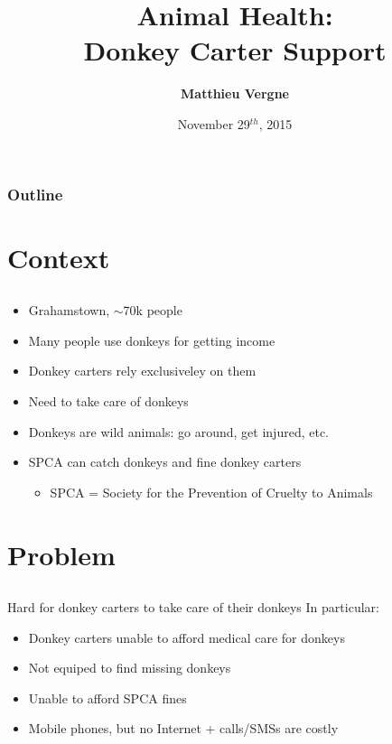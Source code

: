 \documentclass{beamer}
\title{Animal Health: \\Donkey Carter Support}
\author[Matthieu Vergne (\email{matthieu.vergne@gmail.com})]{
  \textbf{Matthieu Vergne}
  \texorpdfstring{\\ \tiny{\email{vergne@fbk.eu}}}{}
}
\date{November 29$^{th}$, 2015}
\begin{document}
\begin{frame}
\titlepage
\end{frame}

\begin{frame}
\frametitle{Outline}
\tableofcontents[currentsubsection, sectionstyle=show, subsectionstyle=show]
\end{frame}


\section{Context}
\subsection{}

\begin{frame}
\begin{itemize}
 \item Grahamstown, $\sim$70k people
 \pause
 \item Many people use donkeys for getting income
 \pause
 \item Donkey carters rely exclusiveley on them
 \pause
 \item Need to take care of donkeys
 \pause
 \item Donkeys are wild animals: go around, get injured, etc.
 \pause
 \item SPCA can catch donkeys and fine donkey carters
 \begin{itemize}
  \item SPCA = Society for the Prevention of Cruelty to Animals
 \end{itemize}
\end{itemize}
\end{frame}

\section{Problem}
\subsection{}

\begin{frame}
\begin{alertblock}{Hard for donkey carters to take care of their donkeys}
\pause
In particular:
\begin{itemize}
 \item Donkey carters unable to afford medical care for donkeys
 \pause
 \item Not equiped to find missing donkeys
 \pause
 \item Unable to afford SPCA fines
 \pause
 \item Mobile phones, but no Internet + calls/SMSs are costly
\end{itemize}
\end{alertblock}
\end{frame}
\end{document}
